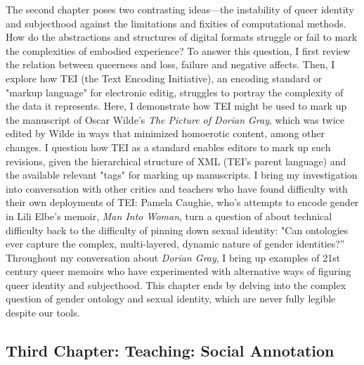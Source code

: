 \documentclass[11pt]{article}
\begin{document}
The second chapter poses two contrasting ideas---the instability of
queer identity and subjecthood against the limitations and fixities of
computational methods. How do the abstractions and structures of
digital formats struggle or fail to mark the complexities of embodied
experience? To answer this question, I first review the relation
between queerness and loss, failure and negative affects. Then, I
explore how TEI (the Text Encoding Initiative), an encoding standard
or "markup language" for electronic editig, struggles to portray the
complexity of the data it represents. Here, I demonstrate how TEI
might be used to mark up the manuscript of Oscar Wilde's \emph{The Picture
of Dorian Gray}, which was twice edited by Wilde in ways that
minimized homoerotic content, among other changes. I question how TEI
as a standard enables editors to mark up such revisions, given the
hierarchical structure of XML (TEI's parent language) and the
available relevant "tags" for marking up manuscripts. I bring my
investigation into conversation with other critics and teachers who
have found difficulty with their own deployments of TEI: Pamela
Caughie, who's attempts to encode gender in Lili Elbe's memoir, \emph{Man
Into Woman}, turn a question of about technical difficulty back to the
difficulty of pinning down sexual identity: "Can ontologies ever
capture the complex, multi-layered, dynamic nature of gender
identities?” Throughout my conversation about \emph{Dorian Gray}, I bring
up examples of 21st century queer memoirs who have experimented with
alternative ways of figuring queer identity and subjecthood. This
chapter ends by delving into the complex question of gender ontology
and sexual identity, which are never fully legible despite our tools.

\subsection{Third Chapter: Teaching: Social Annotation}
\label{sec:org93c066f}
\end{document}
